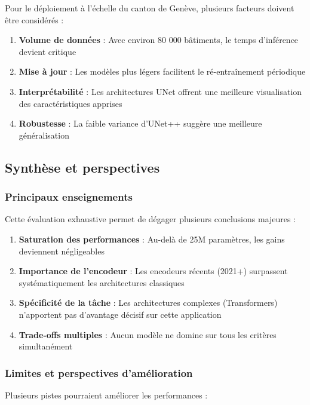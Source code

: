 Pour le déploiement à l'échelle du canton de Genève, plusieurs facteurs doivent être considérés :

\begin{enumerate}
    \item \textbf{Volume de données} : Avec environ 80 000 bâtiments, le temps d'inférence devient critique
    \item \textbf{Mise à jour} : Les modèles plus légers facilitent le ré-entraînement périodique
    \item \textbf{Interprétabilité} : Les architectures UNet offrent une meilleure visualisation des caractéristiques apprises
    \item \textbf{Robustesse} : La faible variance d'UNet++ suggère une meilleure généralisation
\end{enumerate}

\subsection{Synthèse et perspectives}

\subsubsection{Principaux enseignements}

Cette évaluation exhaustive permet de dégager plusieurs conclusions majeures :

\begin{enumerate}
    \item \textbf{Saturation des performances} : Au-delà de 25M paramètres, les gains deviennent négligeables
    \item \textbf{Importance de l'encodeur} : Les encodeurs récents (2021+) surpassent systématiquement les architectures classiques
    \item \textbf{Spécificité de la tâche} : Les architectures complexes (Transformers) n'apportent pas d'avantage décisif sur cette application
    \item \textbf{Trade-offs multiples} : Aucun modèle ne domine sur tous les critères simultanément
\end{enumerate}

\subsubsection{Limites et perspectives d'amélioration}

Plusieurs pistes pourraient améliorer les performances :

